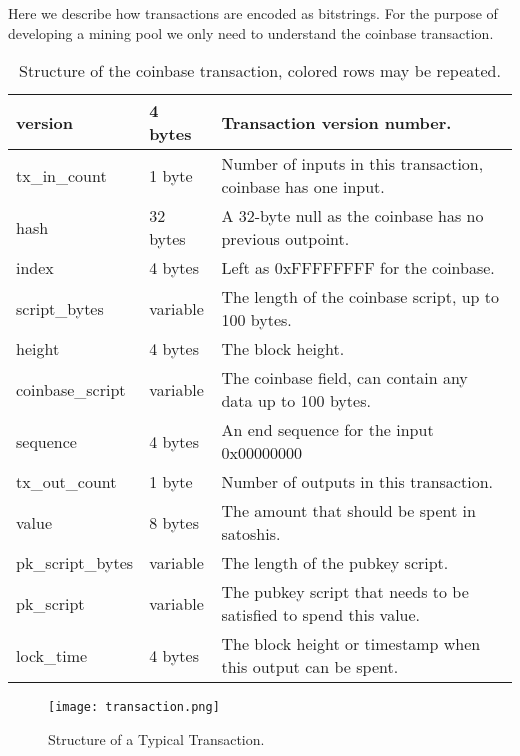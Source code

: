 Here we describe how transactions are encoded as bitstrings. For the purpose of developing a mining pool we only need to understand the coinbase transaction.

\begin{table}[H]
\centering
\begin{tabular}{|l|l|l|}
\hline
version           & 4 bytes  & Transaction version number.                                       \\ \hline
tx\_in\_count     & 1 byte   & Number of inputs in this transaction, coinbase has one input.     \\ \hline
hash              & 32 bytes & A 32-byte null as the coinbase has no previous outpoint.          \\ \hline
index             & 4 bytes  & Left as 0xFFFFFFFF for the coinbase.                              \\ \hline
script\_bytes     & variable & The length of the coinbase script, up to 100 bytes.               \\ \hline
height            & 4 bytes  & The block height.                                                 \\ \hline
coinbase\_script  & variable & The coinbase field, can contain any data up to 100 bytes.         \\ \hline
sequence          & 4 bytes  & An end sequence for the input 0x00000000                          \\ \hline
tx\_out\_count    & 1 byte   & Number of outputs in this transaction.                            \\ \hline
\rowcolor[HTML]{FFFFC7} 
value             & 8 bytes  & The amount that should be spent in satoshis.                      \\ \hline
\rowcolor[HTML]{FFFFC7} 
pk\_script\_bytes & variable & The length of the pubkey script.                                  \\ \hline
\rowcolor[HTML]{FFFFC7} 
pk\_script        & variable & The pubkey script that needs to be satisfied to spend this value. \\ \hline
lock\_time        & 4 bytes  & The block height or timestamp when this output can be spent. \\ \hline
\end{tabular}
\caption{Structure of the coinbase transaction, colored rows may be repeated.}
\end{table}

\begin{figure}[h]
    \centering
    \texttt{[image: transaction.png]}
    \caption{Structure of a Typical Transaction.}
    \label{fig:block_header}
\end{figure}


